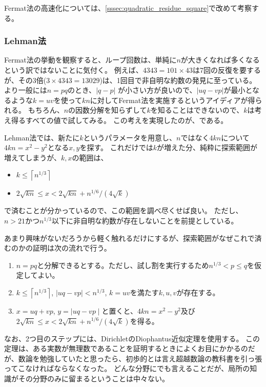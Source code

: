 Fermat法の高速化については、\ref{sssec:quadratic_residue_square}で改めて考察する。

\subsubsection{Lehman法}
\label{sssec:lehman_method}
Fermat法の挙動を観察すると、ループ回数は、単純に$n$が大きくなれば多くなるという訳ではないことに気付く。
例えば、$4343=101\times43$は7回の反復を要するが、その3倍($3\times4343=13029$)は、1回目で非自明な約数の発見に至っている。
より一般には$n=pq$のとき、$|q-p|$ が小さい方が良いので、$|uq-vp|$が最小となるような$k=uv$を使って$kn$に対してFermat法を実施するというアイディアが得られる。
もちろん、$n$の因数分解を知らずして$k$を知ることはできないので、$k$は考え得るすべての値で試してみる。
この考えを実現したのが、\cite{Lehman1974FactoringLI}である。

Lehman法では、新たに$k$というパラメータを用意し、$n$ではなく$4kn$について$4kn=x^2-y^2$となる$x,y$を探す。
これだけでは$k$が増えた分、純粋に探索範囲が増えてしまうが、$k,x$の範囲は、
\begin{itemize}
\item $k \le \left \lceil n^{1/3}\right \rceil$
\item $2\sqrt{kn}\le x < 2\sqrt{kn}+n^{1/6}/(4\sqrt{k})$
\end{itemize}
で済むことが分かっているので、この範囲を調べ尽くせば良い。
ただし、$n>21$かつ$n^{1/3}$以下に非自明な約数が存在しないことを前提としている。


あまり興味がないだろうから軽く触れるだけにするが、探索範囲がなぜこれで済むのかの証明は次の流れで行う。
\begin{enumerate}
 \item $n=pq$と分解できるとする。ただし、試し割を実行するため$n^{1/3}<p\le q$を仮定してよい。
 \item $k \le \left \lceil n^{1/3}\right \rceil$, $\mid uq - vp \mid < n^{1/3}$, $k = uv$を満たす$k, u, v$が存在する。
 \item $x = uq + vp$, $y = \mid uq - vp \mid$と置くと、$4kn=x^2-y^2$及び$2\sqrt{kn}\le x < 2\sqrt{kn}+n^{1/6}/(4\sqrt{k})$を得る。
\end{enumerate}

なお、2つ目のステップには、DirichletのDiophantus近似定理を使用する。
この定理は、ある実数が無理数であることを証明するときによくお目にかかるのだが、数論を勉強していたと思ったら、初歩的とは言え超越数論の教科書を引っ張ってこなければならなくなった。
どんな分野にでも言えることだが、局所の知識がその分野のみに留まるということは中々ない。

